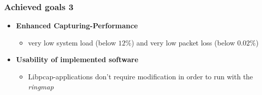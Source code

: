 \begin{frame}
\frametitle{Achieved goals 3}
\begin{itemize}
	\item \textbf{Enhanced Capturing-Performance}
		\begin{itemize}
			\item very low  system load (below $12\%$) and very low
				packet loss  (below  $0.02\%$)\newline
		\end{itemize}
	\item \textbf{Usability of implemented software}
		\begin{itemize}
			\item Libpcap-applications don't require modification in order to run with the \emph{ringmap}
		\end{itemize}
\end{itemize}
\end{frame}
